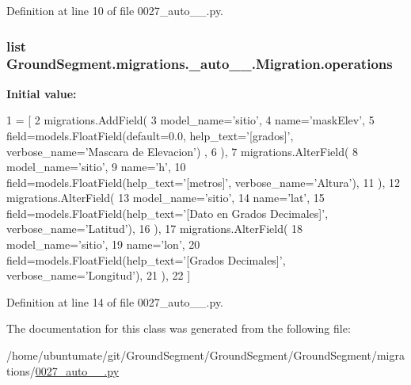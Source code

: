 Definition at line 10 of file 0027\+\_\+auto\+\_\+\_.\+py.

\hypertarget{class_ground_segment_1_1migrations_1_10027__auto__20170115__1508_1_1_migration_ac353078e3c9d509dc20dc02024379438}{}
\subsubsection[{operations}]{\setlength{\rightskip}{0pt plus 5cm}list Ground\+Segment.\+migrations.\+\_\+auto\+\_\+\_.\+Migration.\+operations\hspace{0.3cm}{\ttfamily [static]}}\label{class_ground_segment_1_1migrations_1_10027__auto__20170115__1508_1_1_migration_ac353078e3c9d509dc20dc02024379438}
{\bfseries Initial value\+:}
\begin{DoxyCode}
1 = [
2         migrations.AddField(
3             model\_name=\textcolor{stringliteral}{'sitio'},
4             name=\textcolor{stringliteral}{'maskElev'},
5             field=models.FloatField(default=0.0, help\_text=\textcolor{stringliteral}{'[grados]'}, verbose\_name=\textcolor{stringliteral}{'Mascara de Elevacion'})
      ,
6         ),
7         migrations.AlterField(
8             model\_name=\textcolor{stringliteral}{'sitio'},
9             name=\textcolor{stringliteral}{'h'},
10             field=models.FloatField(help\_text=\textcolor{stringliteral}{'[metros]'}, verbose\_name=\textcolor{stringliteral}{'Altura'}),
11         ),
12         migrations.AlterField(
13             model\_name=\textcolor{stringliteral}{'sitio'},
14             name=\textcolor{stringliteral}{'lat'},
15             field=models.FloatField(help\_text=\textcolor{stringliteral}{'[Dato en Grados Decimales]'}, verbose\_name=\textcolor{stringliteral}{'Latitud'}),
16         ),
17         migrations.AlterField(
18             model\_name=\textcolor{stringliteral}{'sitio'},
19             name=\textcolor{stringliteral}{'lon'},
20             field=models.FloatField(help\_text=\textcolor{stringliteral}{'[Grados Decimales]'}, verbose\_name=\textcolor{stringliteral}{'Longitud'}),
21         ),
22     ]
\end{DoxyCode}


Definition at line 14 of file 0027\+\_\+auto\+\_\+\_.\+py.



The documentation for this class was generated from the following file\+:\begin{DoxyCompactItemize}
\item 
/home/ubuntumate/git/\+Ground\+Segment/\+Ground\+Segment/\+Ground\+Segment/migrations/\hyperlink{0027__auto__20170115__1508_8py}{0027\+\_\+auto\+\_\+\_.\+py}\end{DoxyCompactItemize}
